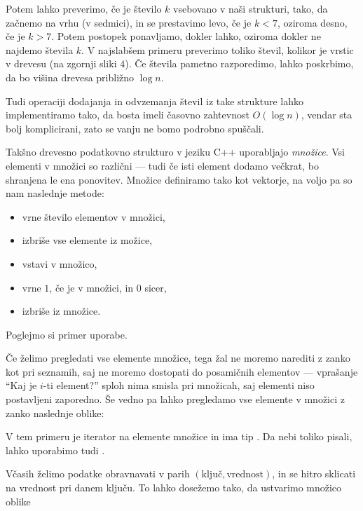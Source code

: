 Potem lahko preverimo, če je število $k$ vsebovano v naši strukturi, tako, da
začnemo na vrhu (v sedmici), in se prestavimo levo, če je $k < 7$, oziroma
desno, če je $k > 7$.
Potem postopek ponavljamo, dokler lahko, oziroma dokler ne najdemo števila $k$.
V najslabšem primeru preverimo toliko števil, kolikor je vrstic v drevesu (na
zgornji sliki $4$).
Če števila pametno razporedimo, lahko poskrbimo, da bo višina drevesa približno
$\log n$.

Tudi operaciji dodajanja in odvzemanja števil iz take strukture lahko
implementiramo tako, da bosta imeli časovno zahtevnost $O(\log n)$, vendar sta
bolj komplicirani, zato se vanju ne bomo podrobno spuščali.

Takšno drevesno podatkovno strukturo v jeziku C++ uporabljajo \emph{množice}.
Vsi elementi v množici so različni --- tudi če isti element dodamo večkrat, bo
shranjena le ena ponovitev.
Množice definiramo tako kot vektorje, na voljo pa so nam naslednje metode:
\begin{itemize}
\item {} vrne število elementov v množici,
\item {} izbriše vse elemente iz možice,
\item {} vstavi  v množico,
\item {} vrne $1$, če je  v množici, in $0$ sicer,
\item {} izbriše  iz množice.
\end{itemize}
Poglejmo si primer uporabe.


Če želimo pregledati vse elemente množice, tega žal ne moremo narediti z zanko
kot pri seznamih, saj ne moremo dostopati do posamičnih elementov --- vprašanje
\enquote{Kaj je $i$-ti element?} sploh nima smisla pri množicah, saj elementi
niso postavljeni zaporedno.
Še vedno pa lahko pregledamo vse elemente v množici z zanko naslednje oblike:


V tem primeru je  iterator na elemente množice in ima tip
.
Da nebi toliko pisali, lahko uporabimo tudi .


Včasih želimo podatke obravnavati v parih $(\text{ključ}, \text{vrednost})$,
in se hitro sklicati na vrednost pri danem ključu.
To lahko dosežemo tako, da ustvarimo množico oblike

